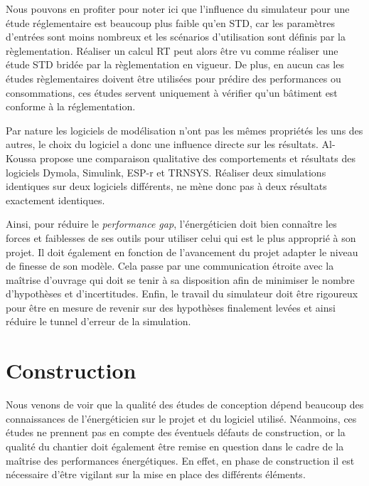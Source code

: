 Nous pouvons en profiter pour noter ici que l'influence du simulateur pour une étude réglementaire est beaucoup plus faible qu'en STD, car les paramètres d'entrées sont moins nombreux et les scénarios d'utilisation sont définis par la règlementation. Réaliser un calcul RT peut alors être vu comme réaliser une étude STD bridée par la règlementation en vigueur. De plus, en aucun cas les études règlementaires doivent être utilisées pour prédire des performances ou consommations, ces études servent uniquement à vérifier qu'un bâtiment est conforme à la réglementation.

Par nature les logiciels de modélisation n'ont pas les mêmes propriétés les uns des autres, le choix du logiciel a donc une influence directe sur les résultats. Al-Koussa \cite{AlKoussa-14} propose une comparaison qualitative des comportements et résultats des logiciels Dymola, Simulink, ESP-r et TRNSYS. Réaliser deux simulations identiques sur deux logiciels différents, ne mène donc pas à deux résultats exactement identiques.

Ainsi, pour réduire le \textit{performance gap}, l'énergéticien doit bien connaître les forces et faiblesses de ses outils pour utiliser celui qui est le plus approprié à son projet. Il doit également en fonction de l'avancement du projet adapter le niveau de finesse de son modèle. Cela passe par une communication étroite avec la maîtrise d'ouvrage qui doit se tenir à sa disposition afin de minimiser le nombre d'hypothèses et d'incertitudes. Enfin, le travail du simulateur doit être rigoureux pour être en mesure de revenir sur des hypothèses finalement levées et ainsi réduire le tunnel d'erreur de la simulation.

\section{Construction}

Nous venons de voir que la qualité des études de conception dépend beaucoup des connaissances de l'énergéticien sur le projet et du logiciel utilisé. Néanmoins, ces études ne prennent pas en compte des éventuels défauts de construction, or la qualité du chantier doit également être remise en question dans le cadre de la maîtrise des performances énergétiques. En effet, en phase de construction il est nécessaire d'être vigilant sur la mise en place des différents éléments. 

